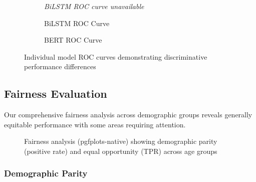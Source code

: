 \documentclass[conference]{IEEEtran}
\begin{document}
\begin{figure}[H]
\begin{subfigure}{0.32\linewidth}
{        }{%
            \textit{BiLSTM ROC curve unavailable}
        }
        \caption{BiLSTM ROC Curve}
    \end{subfigure}
    \hfill
    \begin{subfigure}{0.32\linewidth}
        \centering
        \caption{BERT ROC Curve}
    \end{subfigure}
    \caption{Individual model ROC curves demonstrating discriminative performance differences}
    \label{fig:individual_roc}
\end{figure}

\subsection{Fairness Evaluation}

Our comprehensive fairness analysis across demographic groups reveals generally equitable performance with some areas requiring attention.

\begin{figure}[H]
    \centering
    \FairnessPlots
    \caption{Fairness analysis (pgfplots-native) showing demographic parity (positive rate) and equal opportunity (TPR) across age groups}
    \label{fig:fairness}
\end{figure}

\subsubsection{Demographic Parity}
\end{document}

